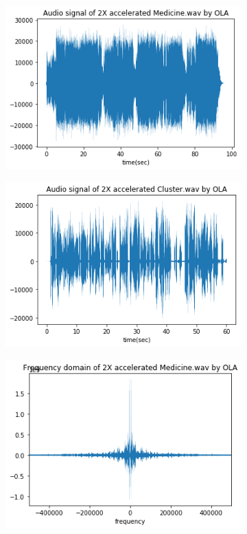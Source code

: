 \documentclass{article}
\begin{document}
\begin{figure}[h!]
\centering
    \begin{subfigure}{0.45\textwidth}
      \includegraphics[width=\textwidth]{Medicine_2X_OLA.png}
    \end{subfigure}%
    \begin{subfigure}{0.45\textwidth}
      \includegraphics[width=\textwidth]{Cluster_2X_OLA.png}
    \end{subfigure}
    \begin{subfigure}{0.45\textwidth}
      \includegraphics[width=\textwidth]{Medicine_2X_OLA_freq.png}

\end{subfigure}
\end{figure}
\end{document}
